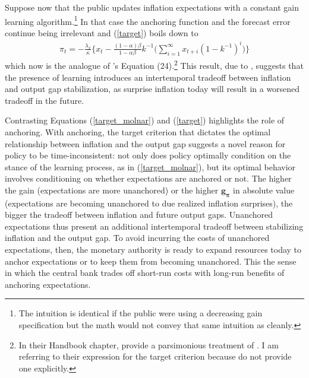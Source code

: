 \documentclass[11pt]{article}
\renewcommand{\[}{\begin{equation}}
\renewcommand{\]}{\end{equation}}
\begin{document}
Suppose now that the public updates inflation expectations with a constant gain learning algorithm.\footnote{The intuition is identical if the public were using a decreasing gain specification but the math would not convey that same intuition as cleanly.} In that case the anchoring function and the forecast error continue being irrelevant and (\ref{target}) boils down to
\begin{align}
\pi_t  = -\frac{\lambda_x}{\kappa}\bigg\{x_t - \frac{(1-\alpha)\beta}{1-\alpha\beta} k^{-1}
\bigg(\sum_{i=1}^{\infty}x_{t+i}(1-k^{-1})^i \bigg)
\bigg\} \label{target_molnar}
\end{align}
which now is the analogue of \cite{gaspar2010inflation}'s Equation (24).\footnote{In their Handbook chapter, \cite{gaspar2010inflation} provide a parsimonious treatment of \cite{molnar2014optimal}. I am referring to their expression for the target criterion because \cite{molnar2014optimal} do not provide one explicitly.} This result, due to \cite{molnar2014optimal}, suggests that the presence of learning introduces an intertemporal tradeoff between inflation and output gap stabilization, as surprise inflation today will result in a worsened tradeoff in the future.

Contrasting Equations (\ref{target_molnar}) and (\ref{target}) highlights the role of anchoring. With anchoring, the target criterion that dictates the optimal relationship between inflation and the output gap suggests a novel reason for policy to be time-inconsistent: not only does policy optimally condition on the stance of the learning process, as in (\ref{target_molnar}), but its optimal behavior involves conditioning on whether expectations are anchored or not. The higher the gain (expectations are more unanchored) or the higher $\mathbf{g_{\pi}}$ in absolute value (expectations are becoming unanchored to due realized inflation surprises), the bigger the tradeoff between inflation and future output gaps. Unanchored expectations thus present an additional intertemporal tradeoff between stabilizing inflation and the output gap. To avoid incurring the costs of unanchored expectations, then, the monetary authority is ready to expand resources today to anchor expectations or to keep them from becoming unanchored. This the sense in which the central bank trades off short-run costs with long-run benefits of anchoring expectations.
\end{document}
